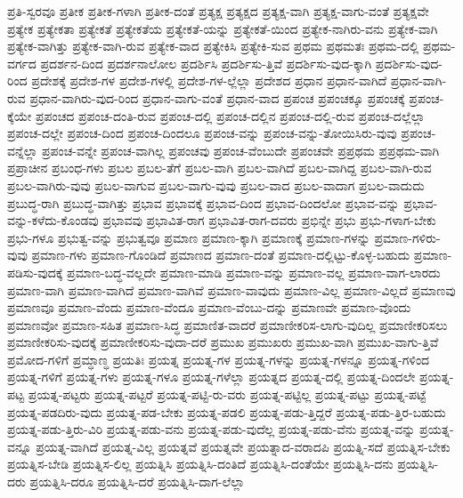 {ಪ್ರತಿ-ಸ್ವರವೂ
ಪ್ರತೀಕ
ಪ್ರತೀಕ-ಗಳಾಗಿ
ಪ್ರತೀಕ-ದಂತೆ
ಪ್ರತ್ಯಕ್ಷ
ಪ್ರತ್ಯಕ್ಷದ
ಪ್ರತ್ಯಕ್ಷ-ವಾಗಿ
ಪ್ರತ್ಯಕ್ಷ-ವಾಗು-ವಂತೆ
ಪ್ರತ್ಯಕ್ಷವೇ
ಪ್ರತ್ಯೇಕ
ಪ್ರತ್ಯೇಕತಾ
ಪ್ರತ್ಯೇಕತೆ
ಪ್ರತ್ಯೇಕತೆಯ
ಪ್ರತ್ಯೇಕತೆ-ಯನ್ನು
ಪ್ರತ್ಯೇಕತೆ-ಯಿಂದ
ಪ್ರತ್ಯೇಕ-ನಾಗಿರು-ವನು
ಪ್ರತ್ಯೇಕ-ವಾಗಿ
ಪ್ರತ್ಯೇಕ-ವಾಗಿತ್ತು
ಪ್ರತ್ಯೇಕ-ವಾಗಿ-ರುವ
ಪ್ರತ್ಯೇಕ-ವಾದ
ಪ್ರತ್ಯೇಕಿಸಿ
ಪ್ರತ್ಯೇಕಿ-ಸುವ
ಪ್ರಥಮ
ಪ್ರಥಮತಃ
ಪ್ರಥಮ-ದಲ್ಲಿ
ಪ್ರಥಮ-ವರ್ಗದ
ಪ್ರದರ್ಶನ-ದಿಂದ
ಪ್ರದರ್ಶನಾಲೋಲ
ಪ್ರದರ್ಶಿಸಿ
ಪ್ರದರ್ಶಿಸು-ತ್ತಿವೆ
ಪ್ರದರ್ಶಿಸು-ವುದ-ಕ್ಕಾಗಿ
ಪ್ರದರ್ಶಿಸು-ವುದ-ರಿಂದ
ಪ್ರದೇಶಕ್ಕೆ
ಪ್ರದೇಶ-ಗಳ
ಪ್ರದೇಶ-ಗಳಲ್ಲಿ
ಪ್ರದೇಶ-ಗಳ-ಲ್ಲೆಲ್ಲಾ
ಪ್ರದೇಶದ
ಪ್ರಧಾನ
ಪ್ರಧಾನ-ವಾಗಿದೆ
ಪ್ರಧಾನ-ವಾಗಿ-ರುವ
ಪ್ರಧಾನ-ವಾಗಿರು-ವುದ-ರಿಂದ
ಪ್ರಧಾನ-ವಾಗು-ವಂತೆ
ಪ್ರಧಾನ-ವಾದ
ಪ್ರಪಂಚ
ಪ್ರಪಂಚಕ್ಕೂ
ಪ್ರಪಂಚಕ್ಕೆ
ಪ್ರಪಂಚ-ಕ್ಕೆಯೇ
ಪ್ರಪಂಚದ
ಪ್ರಪಂಚ-ದಂತಿ-ರುವ
ಪ್ರಪಂಚ-ದಲ್ಲಿ
ಪ್ರಪಂಚ-ದಲ್ಲಿನ
ಪ್ರಪಂಚ-ದಲ್ಲಿ-ರುವ
ಪ್ರಪಂಚ-ದಲ್ಲೆಲ್ಲಾ
ಪ್ರಪಂಚ-ದಲ್ಲೇ
ಪ್ರಪಂಚ-ದಿಂದ
ಪ್ರಪಂಚ-ದಿಂದಲೂ
ಪ್ರಪಂಚ-ವನ್ನು
ಪ್ರಪಂಚ-ವನ್ನು-ತೋಯಿಸಿರು-ವುವು
ಪ್ರಪಂಚ-ವನ್ನೆಲ್ಲಾ
ಪ್ರಪಂಚ-ವನ್ನೇ
ಪ್ರಪಂಚ-ವಾಗಿಲ್ಲ
ಪ್ರಪಂಚವು
ಪ್ರಪಂಚ-ವೆಂಬುದೇ
ಪ್ರಪಂಚವೇ
ಪ್ರಪ್ರಥಮ
ಪ್ರಪ್ರಥಮ-ವಾಗಿ
ಪ್ರಪ್ರಾಚೀನ
ಪ್ರಬಂಧ-ಗಳು
ಪ್ರಬಲ
ಪ್ರಬಲ-ತೆಗೆ
ಪ್ರಬಲ-ವಾಗಿ
ಪ್ರಬಲ-ವಾಗಿದೆ
ಪ್ರಬಲ-ವಾಗಿದ್ದ
ಪ್ರಬಲ-ವಾಗಿ-ರುವ
ಪ್ರಬಲ-ವಾಗಿರು-ವುವು
ಪ್ರಬಲ-ವಾಗುವ
ಪ್ರಬಲ-ವಾಗು-ವುವು
ಪ್ರಬಲ-ವಾದ
ಪ್ರಬಲ-ವಾದಾಗ
ಪ್ರಬಲ-ವಾದುದು
ಪ್ರಬುದ್ಧ-ರಾಗಿ
ಪ್ರಬುದ್ಧ-ವಾಗಿತ್ತು
ಪ್ರಭಾವ
ಪ್ರಭಾವಕ್ಕೆ
ಪ್ರಭಾವ-ದಿಂದ
ಪ್ರಭಾವ-ದಿಂದಲೋ
ಪ್ರಭಾವ-ವನ್ನು
ಪ್ರಭಾವ-ವನ್ನು-ಕಳೆದು-ಕೊಂಡವು
ಪ್ರಭಾವವು
ಪ್ರಭಾವಿತ-ರಾಗ
ಪ್ರಭಾವಿತ-ರಾಗ-ದವರು
ಪ್ರಭಿನ್ನೇ
ಪ್ರಭು
ಪ್ರಭು-ಗಳಾಗ-ಬೇಕು
ಪ್ರಭು-ಗಳೂ
ಪ್ರಭುತ್ವ-ವನ್ನು
ಪ್ರಭುತ್ವವೂ
ಪ್ರಮಾಣ
ಪ್ರಮಾಣ-ಕ್ಕಾಗಿ
ಪ್ರಮಾಣಕ್ಕೆ
ಪ್ರಮಾಣ-ಗಳನ್ನು
ಪ್ರಮಾಣ-ಗಳಿರು-ವುವು
ಪ್ರಮಾಣ-ಗಳು
ಪ್ರಮಾಣ-ಗೊಂಡಿದೆ
ಪ್ರಮಾಣದ
ಪ್ರಮಾಣ-ದಂತೆ
ಪ್ರಮಾಣ-ದಲ್ಲಿಟ್ಟು-ಕೊಳ್ಳ-ಬಹುದು
ಪ್ರಮಾಣ-ಪಡಿಸು-ವುದಕ್ಕೆ
ಪ್ರಮಾಣ-ಬದ್ಧ-ವಲ್ಲದೇ
ಪ್ರಮಾಣ-ಮಾಡಿ
ಪ್ರಮಾಣ-ವನ್ನು
ಪ್ರಮಾಣ-ವಲ್ಲ
ಪ್ರಮಾಣ-ವಾಗ-ಲಾರದು
ಪ್ರಮಾಣ-ವಾಗಿ
ಪ್ರಮಾಣ-ವಾಗಿದೆ
ಪ್ರಮಾಣ-ವಾಗಿವೆ
ಪ್ರಮಾಣ-ವಾವುದು
ಪ್ರಮಾಣ-ವಿಲ್ಲ
ಪ್ರಮಾಣ-ವಿಲ್ಲದೆ
ಪ್ರಮಾಣವು
ಪ್ರಮಾಣವೂ
ಪ್ರಮಾಣ-ವೆಂದು
ಪ್ರಮಾಣ-ವೆಂದೂ
ಪ್ರಮಾಣ-ವೆಂಬು-ದನ್ನು
ಪ್ರಮಾಣವೇ
ಪ್ರಮಾಣ-ವೊಂದು
ಪ್ರಮಾಣವೋ
ಪ್ರಮಾಣ-ಸಹಿತ
ಪ್ರಮಾಣ-ಸಿದ್ಧ
ಪ್ರಮಾಣಿತ-ವಾದರೆ
ಪ್ರಮಾಣೀಕರಿಸ-ಲಾಗು-ವುದಿಲ್ಲ
ಪ್ರಮಾಣೀಕರಿಸಲು
ಪ್ರಮಾಣೀಕರಿಸು-ವುದಕ್ಕೆ
ಪ್ರಮಾಣೀಕರಿಸು-ವುದಾ-ದರೆ
ಪ್ರಮುಖ
ಪ್ರಮುಖರು
ಪ್ರಮುಖ-ವಾಗಿ
ಪ್ರಮುಖ-ವಾಗು-ತ್ತಿವೆ
ಪ್ರಮೋದ-ಗಳಿಗೆ
ಪ್ರಮ್ಧಾಣ್ಧ
ಪ್ರಯತಿಃ
ಪ್ರಯತ್ನ
ಪ್ರಯತ್ನ-ಗಳ
ಪ್ರಯತ್ನ-ಗಳನ್ನು
ಪ್ರಯತ್ನ-ಗಳನ್ನೂ
ಪ್ರಯತ್ನ-ಗಳಿಂದ
ಪ್ರಯತ್ನ-ಗಳಿಗೆ
ಪ್ರಯತ್ನ-ಗಳು
ಪ್ರಯತ್ನ-ಗಳೂ
ಪ್ರಯತ್ನ-ಗಳೆಲ್ಲಾ
ಪ್ರಯತ್ನದ
ಪ್ರಯತ್ನ-ದಲ್ಲಿ
ಪ್ರಯತ್ನ-ದಿಂದಲೇ
ಪ್ರಯತ್ನ-ಪಟ್ಟ
ಪ್ರಯತ್ನ-ಪಟ್ಟರು
ಪ್ರಯತ್ನ-ಪಟ್ಟರೆ
ಪ್ರಯತ್ನ-ಪಟ್ಟಿ-ರು-ವರು
ಪ್ರಯತ್ನ-ಪಟ್ಟಿಲ್ಲ
ಪ್ರಯತ್ನ-ಪಟ್ಟು
ಪ್ರಯತ್ನ-ಪಟ್ಟೆ
ಪ್ರಯತ್ನ-ಪಡದಿರು-ವುದು
ಪ್ರಯತ್ನ-ಪಡ-ಬೇಕು
ಪ್ರಯತ್ನ-ಪಡಲಿ
ಪ್ರಯತ್ನ-ಪಡು-ತ್ತಿದ್ದರೆ
ಪ್ರಯತ್ನ-ಪಡು-ತ್ತಿರ-ಬಹುದು
ಪ್ರಯತ್ನ-ಪಡು-ತ್ತಿರು-ವಿರಿ
ಪ್ರಯತ್ನ-ಪಡು-ವನು
ಪ್ರಯತ್ನ-ಪಡು-ವುದೆಲ್ಲ
ಪ್ರಯತ್ನ-ಪಡು-ವೆನು
ಪ್ರಯತ್ನ-ವನ್ನು
ಪ್ರಯತ್ನ-ವನ್ನೂ
ಪ್ರಯತ್ನ-ವಾಗಿದೆ
ಪ್ರಯತ್ನ-ವಿಲ್ಲ
ಪ್ರಯತ್ನವೆ
ಪ್ರಯತ್ನವೇ
ಪ್ರಯತ್ನಾದ-ವರಾದಪಿ
ಪ್ರಯತ್ನಿ-ಸದೆ
ಪ್ರಯತ್ನಿಸ-ಬೇಕು
ಪ್ರಯತ್ನಿಸ-ಬೇಡಿ
ಪ್ರಯತ್ನಿಸ-ಲಿಲ್ಲ
ಪ್ರಯತ್ನಿಸಿ
ಪ್ರಯತ್ನಿಸಿ-ದಂತಿದೆ
ಪ್ರಯತ್ನಿಸಿ-ದಂತೆಯೇ
ಪ್ರಯತ್ನಿಸಿ-ದನು
ಪ್ರಯತ್ನಿಸಿ-ದರು
ಪ್ರಯತ್ನಿಸಿ-ದರೂ
ಪ್ರಯತ್ನಿಸಿ-ದರೆ
ಪ್ರಯತ್ನಿಸಿ-ದಾಗ-ಲೆಲ್ಲಾ
}
